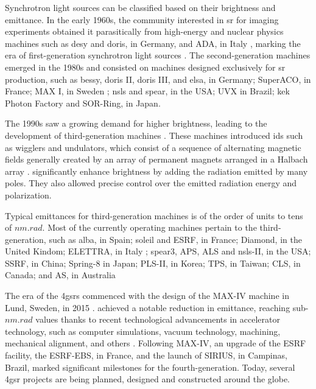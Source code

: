 Synchrotron light sources can be classified based on their brightness and emittance. In the early 1960s, the community interested in \gls*{sr} for imaging experiments obtained it parasitically from high-energy and nuclear physics machines such as \acrshort*{desy} and \acrshort*{doris}, in Germany, and ADA, in Italy \cite{simoulin_synchrotron_2016}, marking the era of first-generation synchrotron light sources \cite{liu_towards_2017}. The second-generation machines emerged in the 1980s and consisted on machines designed exclusively for \gls*{sr} production, such as \acrshort*{bessy}, \acrshort*{doris} II, \acrshort*{doris} III, and \acrshort*{elsa}, in Germany; \gls*{SuperACO}, in France; MAX I, in Sweden \cite{simoulin_synchrotron_2016}; \acrshort*{nsls} and \acrshort*{spear}, in the USA; \gls*{UVX} in Brazil; \gls*{kek} Photon Factory and \gls*{SOR-Ring}, in Japan.

The 1990s saw a growing demand for higher brightness, leading to the development of third-generation machines \cite{liu_towards_2017}. These machines introduced \glspl*{id} such as wigglers and undulators, which consist of a sequence of alternating magnetic fields generally created by an array of permanent magnets arranged in a Halbach array \cite[chapter 7]{clarke2004science}.  significantly enhance brightness by adding the radiation emitted by many poles. They also allowed precise control over the emitted radiation energy and polarization.

Typical emittances for third-generation machines is of the order of units to tens of $\unit{nm}.\unit{rad}$. Most of the currently operating machines pertain to the third-generation, such as \gls*{alba}, in Spain; \acrshort*{soleil} and \acrshort*{ESRF}, in France; Diamond, in the United Kindom; \gls*{ELETTRA}, in Italy \cite{simoulin_synchrotron_2016}; \acrshort*{spear}3, \acrshort*{APS}, \acrshort*{ALS} and \acrshort*{nsls}-II, in the USA; \acrshort*{SSRF}, in China; \acrshort*{Spring-8} in Japan; \acrshort*{PLS}-II, in Korea; \acrshort*{TPS}, in Taiwan; \acrshort*{CLS}, in Canada; and \acrshort*{AS}, in Australia

The era of the \glspl*{4gsr} commenced with the design of the MAX-IV machine in Lund, Sweden, in 2015 \cite{liu_towards_2017,hettel_challenges_2014}.  achieved a notable reduction in emittance, reaching sub-$\unit{nm}.\unit{rad}$ values thanks to recent technological advancements in accelerator technology, such as computer simulations, vacuum technology, machining, mechanical alignment, and others  \cite{hettel_challenges_2014,liu_towards_2017}. Following MAX-IV, an upgrade of the \acrshort*{ESRF} facility, the ESRF-EBS, in France, and the launch of SIRIUS, in Campinas, Brazil, marked significant milestones for the fourth-generation. Today, several \gls*{4gsr} projects are being planned, designed and constructed around the globe.

